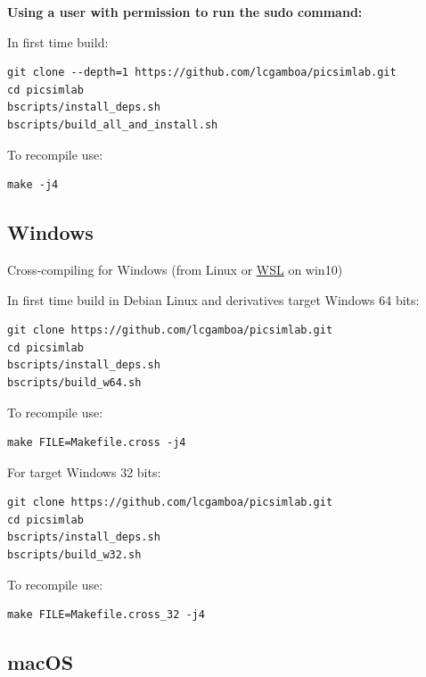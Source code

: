\textbf{Using a user with permission to run the sudo command:}

In first time build:
\begin{verbatim}
git clone --depth=1 https://github.com/lcgamboa/picsimlab.git
cd picsimlab
bscripts/install_deps.sh
bscripts/build_all_and_install.sh
\end{verbatim}

To recompile use:
\begin{verbatim}
make -j4
\end{verbatim}

\subsection{Windows}

 Cross-compiling for Windows (from Linux or \href{https://docs.microsoft.com/windows/wsl/install-win10}{WSL} on win10)

In first time build in Debian Linux and derivatives target Windows 64 bits:

 \begin{verbatim}
git clone https://github.com/lcgamboa/picsimlab.git
cd picsimlab
bscripts/install_deps.sh
bscripts/build_w64.sh
\end{verbatim}

To recompile use:

\begin{verbatim}
make FILE=Makefile.cross -j4 
\end{verbatim}

For target Windows 32 bits:

\begin{verbatim}
git clone https://github.com/lcgamboa/picsimlab.git
cd picsimlab
bscripts/install_deps.sh
bscripts/build_w32.sh
\end{verbatim}

To recompile use:
\begin{verbatim}
make FILE=Makefile.cross_32 -j4 
\end{verbatim}

\subsection{macOS}

